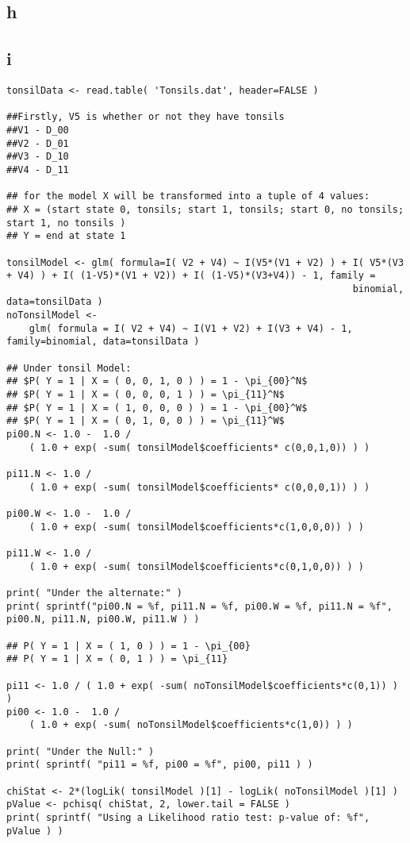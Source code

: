 \documentclass[11pt]{article}
\begin{document}
\subsection{h}
\label{sec-1-8}

\subsection{i}
\label{sec-1-9}

\begin{verbatim}
tonsilData <- read.table( 'Tonsils.dat', header=FALSE )

##Firstly, V5 is whether or not they have tonsils
##V1 - D_00
##V2 - D_01
##V3 - D_10
##V4 - D_11

## for the model X will be transformed into a tuple of 4 values:
## X = (start state 0, tonsils; start 1, tonsils; start 0, no tonsils; start 1, no tonsils )
## Y = end at state 1

tonsilModel <- glm( formula=I( V2 + V4) ~ I(V5*(V1 + V2) ) + I( V5*(V3
+ V4) ) + I( (1-V5)*(V1 + V2)) + I( (1-V5)*(V3+V4)) - 1, family =
                                                             binomial, data=tonsilData )
noTonsilModel <-
    glm( formula = I( V2 + V4) ~ I(V1 + V2) + I(V3 + V4) - 1, family=binomial, data=tonsilData )

## Under tonsil Model:
## $P( Y = 1 | X = ( 0, 0, 1, 0 ) ) = 1 - \pi_{00}^N$
## $P( Y = 1 | X = ( 0, 0, 0, 1 ) ) = \pi_{11}^N$
## $P( Y = 1 | X = ( 1, 0, 0, 0 ) ) = 1 - \pi_{00}^W$
## $P( Y = 1 | X = ( 0, 1, 0, 0 ) ) = \pi_{11}^W$
pi00.N <- 1.0 -  1.0 /
    ( 1.0 + exp( -sum( tonsilModel$coefficients* c(0,0,1,0)) ) )

pi11.N <- 1.0 /
    ( 1.0 + exp( -sum( tonsilModel$coefficients* c(0,0,0,1)) ) )

pi00.W <- 1.0 -  1.0 /
    ( 1.0 + exp( -sum( tonsilModel$coefficients*c(1,0,0,0)) ) )

pi11.W <- 1.0 /
    ( 1.0 + exp( -sum( tonsilModel$coefficients*c(0,1,0,0)) ) )

print( "Under the alternate:" )
print( sprintf("pi00.N = %f, pi11.N = %f, pi00.W = %f, pi11.N = %f", pi00.N, pi11.N, pi00.W, pi11.W ) )

## P( Y = 1 | X = ( 1, 0 ) ) = 1 - \pi_{00}
## P( Y = 1 | X = ( 0, 1 ) ) = \pi_{11}

pi11 <- 1.0 / ( 1.0 + exp( -sum( noTonsilModel$coefficients*c(0,1)) ) )
pi00 <- 1.0 -  1.0 /
    ( 1.0 + exp( -sum( noTonsilModel$coefficients*c(1,0)) ) )

print( "Under the Null:" )
print( sprintf( "pi11 = %f, pi00 = %f", pi00, pi11 ) )

chiStat <- 2*(logLik( tonsilModel )[1] - logLik( noTonsilModel )[1] )
pValue <- pchisq( chiStat, 2, lower.tail = FALSE )
print( sprintf( "Using a Likelihood ratio test: p-value of: %f", pValue ) )
\end{verbatim}
\end{document}
